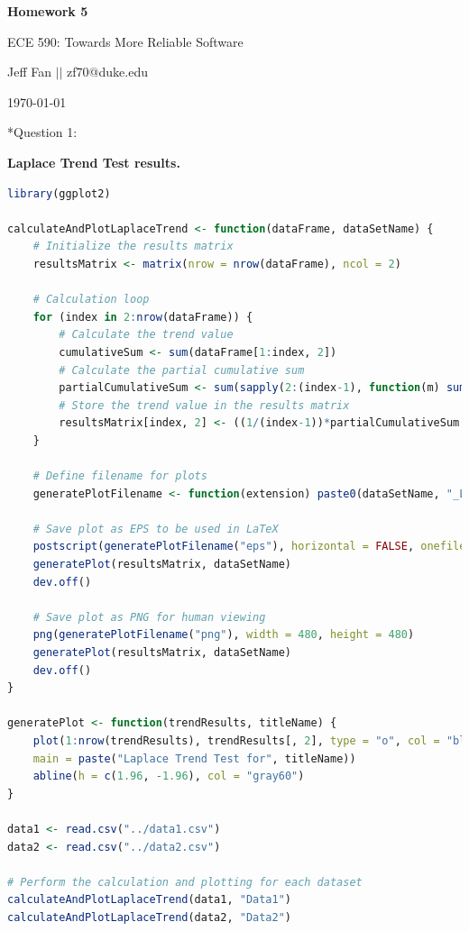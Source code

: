 \documentclass[12pt]{article}
\makeatletter
\numberwithin{table}{section}
\newcommand{\question}[2][]{\begin{flushleft}
		\Large\textbf{Question #1}: \large\textit{#2}
		
\end{flushleft}}
\newcommand{\maketitletwo}[2][]{\begin{center}
		\Large{\textbf{Homework #1}
			
			ECE 590: Towards More Reliable Software} %
		\vspace{5pt}
		
		\normalsize{Jeff Fan  \hspace{1em} $\left|\right|$ \hspace{1em}zf70@duke.edu  %
			
			\today}        %
		\vspace{15pt}
		
\end{center}}
\makeatother
\begin{document}
	\maketitletwo[5]  %
	
	\section*{Question 1: } 
	
	\textbf{Laplace Trend Test results.}

	\begin{lstlisting}[language=R]
library(ggplot2)

calculateAndPlotLaplaceTrend <- function(dataFrame, dataSetName) {
	# Initialize the results matrix
	resultsMatrix <- matrix(nrow = nrow(dataFrame), ncol = 2)
	
	# Calculation loop
	for (index in 2:nrow(dataFrame)) {
		# Calculate the trend value
		cumulativeSum <- sum(dataFrame[1:index, 2])
		# Calculate the partial cumulative sum
		partialCumulativeSum <- sum(sapply(2:(index-1), function(m) sum(dataFrame[1:m, 2])))
		# Store the trend value in the results matrix
		resultsMatrix[index, 2] <- ((1/(index-1))*partialCumulativeSum - cumulativeSum/2)/(cumulativeSum*sqrt(1/(12*(index - 1))))
	}
	
	# Define filename for plots
	generatePlotFilename <- function(extension) paste0(dataSetName, "_LaplaceTrend.", extension)
	
	# Save plot as EPS to be used in LaTeX
	postscript(generatePlotFilename("eps"), horizontal = FALSE, onefile = FALSE, paper = "special", height = 6, width = 6)
	generatePlot(resultsMatrix, dataSetName)
	dev.off()
	
	# Save plot as PNG for human viewing
	png(generatePlotFilename("png"), width = 480, height = 480)
	generatePlot(resultsMatrix, dataSetName)
	dev.off()
}

generatePlot <- function(trendResults, titleName) {
	plot(1:nrow(trendResults), trendResults[, 2], type = "o", col = "blue", xlab = "Index", ylab = "Trend Value",
	main = paste("Laplace Trend Test for", titleName))
	abline(h = c(1.96, -1.96), col = "gray60")
}

data1 <- read.csv("../data1.csv")
data2 <- read.csv("../data2.csv")

# Perform the calculation and plotting for each dataset
calculateAndPlotLaplaceTrend(data1, "Data1")
calculateAndPlotLaplaceTrend(data2, "Data2")\end{lstlisting} 
\end{document}
